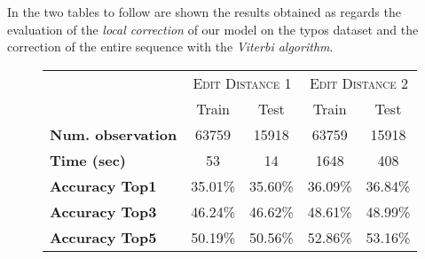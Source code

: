 In the two tables to follow are shown the results obtained as regards the evaluation of the \textit{local correction} of our 
model on the typos dataset and the correction of the entire sequence with the \textit{Viterbi algorithm}.

\begin{figure}[H]
	\centering
	\begin{tabular}{lcc|cc}
		\toprule
		&\multicolumn{2}{c|}{\textsc{Edit Distance 1}} & \multicolumn{2}{c}{\textsc{Edit Distance 2}}\\
		& Train & Test & Train & Test \\
		\midrule
		\textbf{Num. observation} & \num{63759} & \num{15918} & \num{63759} & \num{15918} \\
		\textbf{Time (sec)}  & \num{53} & \num{14} & \num{1648} & \num{408} \\
		\textbf{Accuracy Top1} & \num{35,01}\%  & \num{35,60}\%  & \num{36,09}\%  & \num{36,84}\%  \\
		\textbf{Accuracy Top3} &  \num{46,24}\%  & \num{46,62}\%  & \num{48,61}\%  & \num{48,99}\%  \\
		\textbf{Accuracy Top5} & \num{50,19}\%  & \num{50,56}\%  & \num{52,86}\%  & \num{53,16}\%  \\
		\bottomrule
	\end{tabular}
	\label{tab:typo-eval1}
\end{figure}


